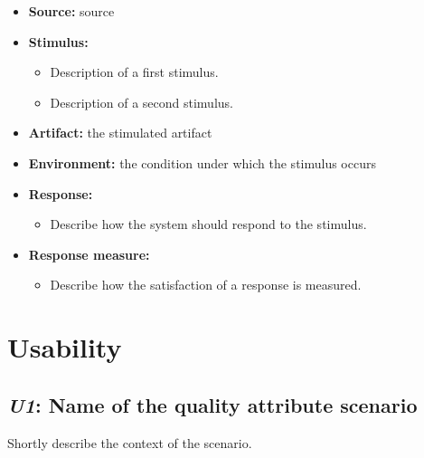 \documentclass[english]{sareport}
\begin{document}
\begin{itemize}
    \item \textbf{Source:} source
    \item \textbf{Stimulus:}
        \begin{itemize}
            \item Description of a first stimulus.
            \item Description of a second stimulus.
        \end{itemize}

    \item \textbf{Artifact:} the stimulated artifact
    \item \textbf{Environment:} the condition under which the stimulus occurs
    \item \textbf{Response:}
        \begin{itemize}
            \item Describe how the system should respond to the stimulus.
        \end{itemize}

    \item \textbf{Response measure:}
        \begin{itemize}
            \item Describe how the satisfaction of a response is measured.
        \end{itemize}
\end{itemize}

\section{Usability}
\subsection{\emph{U1}: Name of the quality attribute scenario}
Shortly describe the context of the scenario.
\end{document}
